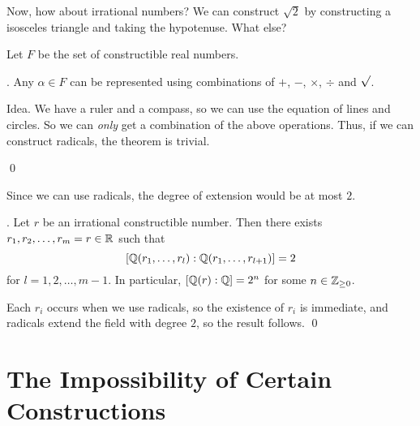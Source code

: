 Now, how about irrational numbers? We can construct \(\sqrt{2}\) by constructing a isosceles triangle and taking the hypotenuse. What else?

Let \(F\) be the set of constructible real numbers.

\thm. Any \(\alpha \in F\) can be represented using combinations of \(+\), \(-\), \(\times\), \(\div\) and \(\sqrt{\vphantom{l}}\).

\pf Idea. We have a ruler and a compass, so we can use the equation of lines and circles. So we can \textit{only} get a combination of the above operations. Thus, if we can construct radicals, the theorem is trivial.

\begin{center}

    \usetikzlibrary {decorations.pathmorphing, decorations.pathreplacing, decorations.shapes}
\end{center}

\vspace*{-10pt}

\qed

Since we can use radicals, the degree of extension would be at most \(2\).

\cor. Let \(r\) be an irrational constructible number. Then there exists \(r_1, r_2, \dots, r_m = r \in \mathbb{R}\) such that
\[
    [\mathbb{Q}(r_1, \dots, r_l) : \mathbb{Q}(r_1, \dots, r_{l+1})] = 2
\]
for \(l = 1, 2, \dots, m - 1\). In particular, \([\mathbb{Q}(r) : \mathbb{Q}] = 2^n\) for some \(n \in \mathbb{Z}_{\geq 0}\).

\pf Each \(r_i\) occurs when we use radicals, so the existence of \(r_i\) is immediate, and radicals extend the field with degree \(2\), so the result follows. \qed

\section*{The Impossibility of Certain Constructions}

